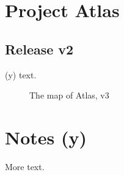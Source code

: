 \documentclass{article}
\newcommand{\proj}{Atlas}
\newcommand{\ver}[1]{v#1}
\newcommand{\opt}[1][x]{(#1)}
\begin{document}
\tableofcontents
\listoffigures
\section{Project \proj}
\subsection{Release \ver{2}}
{\opt[y]} text.
\begin{figure}[h]
\centering
\caption{The map of \proj, \ver{3}}
\end{figure}
\section*{Notes \opt[y]}
More text.
\end{document}
